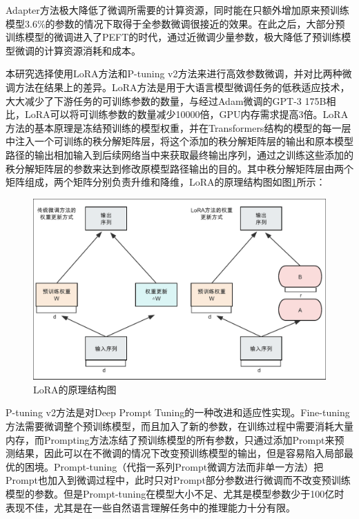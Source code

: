 \documentclass[
    decl-page,  %
    ,fontset = win, %
  ]{njuthesis}
\begin{document}
Adapter方法极大降低了微调所需要的计算资源，同时能在只额外增加原来预训练模型3.6\%的参数的情况下取得于全参数微调很接近的效果\cite{houlsby2019parameter}。在此之后，大部分预训练模型的微调进入了PEFT的时代，通过近微调少量参数，极大降低了预训练模型微调的计算资源消耗和成本。

本研究选择使用LoRA\cite{hu2021lora}方法和P-tuning v2\cite{liu2021p}方法来进行高效参数微调，并对比两种微调方法在结果上的差异。LoRA方法是用于大语言模型微调任务的低秩适应技术，大大减少了下游任务的可训练参数的数量，与经过Adam微调\cite{kingma2014adam}的GPT-3 175B\cite{brown2020language}相比，LoRA可以将可训练参数的数量减少10000倍，GPU内存需求提高3倍。LoRA方法的基本原理是冻结预训练的模型权重，并在Transformers结构的模型的每一层中注入一个可训练的秩分解矩阵层，将这个添加的秩分解矩阵层的输出和原本模型路径的输出相加输入到后续网络当中来获取最终输出序列，通过之训练这些添加的秩分解矩阵层的参数来达到修改原模型路径输出的目的。其中秩分解矩阵层由两个矩阵组成，两个矩阵分别负责升维和降维，LoRA的原理结构图如图\ref{LoRA}所示：

\begin{figure}[ht]
  \centering
  \includegraphics[width=\textwidth]{image/LoRA.pdf}
  \caption{LoRA的原理结构图}
  \label{LoRA}
\end{figure}

P-tuning v2方法是对Deep Prompt Tuning\cite{li2021prefix}\cite{qin2021learning}的一种改进和适应性实现。Fine-tuning方法需要微调整个预训练模型，而且加入了新的参数，在训练过程中需要消耗大量内存，而Prompting方法冻结了预训练模型的所有参数，只通过添加Prompt来预测结果，因此可以在不微调的情况下改变预训练模型的输出，但是容易陷入局部最优的困境。Prompt-tuning（代指一系列Prompt微调方法而非单一方法）把Prompt也加入到微调过程中，此时只对Prompt部分参数进行微调而不改变预训练模型的参数。但是Prompt-tuning在模型大小不足、尤其是模型参数少于100亿时表现不佳，尤其是在一些自然语言理解任务中的推理能力十分有限。
\end{document}
